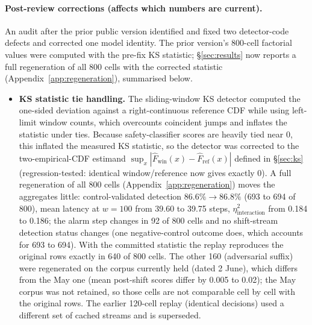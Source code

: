 \documentclass{article}
\begin{document}
\paragraph{Post-review corrections (affects which numbers are current).} An audit after the prior public version identified and fixed two detector-code defects and corrected one model identity. The prior version's 800-cell factorial values were computed with the pre-fix KS statistic; \S\ref{sec:results} now reports a full regeneration of all 800 cells with the corrected statistic (Appendix~\ref{app:regeneration}), summarised below.
\begin{itemize}
\item \textbf{KS statistic tie handling.} The sliding-window KS detector computed the one-sided deviation against a right-continuous reference CDF while using left-limit window counts, which overcounts coincident jumps and inflates the statistic under ties. Because safety-classifier scores are heavily tied near 0, this inflated the measured KS statistic, so the detector was corrected to the two-empirical-CDF estimand $\sup_x|\hat F_{\text{win}}(x)-\hat F_{\text{ref}}(x)|$ defined in \S\ref{sec:ks} (regression-tested: identical window/reference now gives exactly 0). A full regeneration of all 800 cells (Appendix~\ref{app:regeneration}) moves the aggregates little: control-validated detection $86.6\% \to 86.8\%$ (693 to 694 of 800), mean latency at $w{=}100$ from 39.60 to 39.75 steps, $\eta^2_{\text{interaction}}$ from 0.184 to 0.186; the alarm step changes in 92 of 800 cells and no shift-stream detection status changes (one negative-control outcome does, which accounts for 693 to 694). With the committed statistic the replay reproduces the original rows exactly in 640 of 800 cells. The other 160 (adversarial suffix) were regenerated on the corpus currently held (dated 2 June), which differs from the May one (mean post-shift scores differ by 0.005 to 0.02); the May corpus was not retained, so those cells are not comparable cell by cell with the original rows. The earlier 120-cell replay (identical decisions) used a different set of cached streams and is superseded.

\end{itemize}
\end{document}
